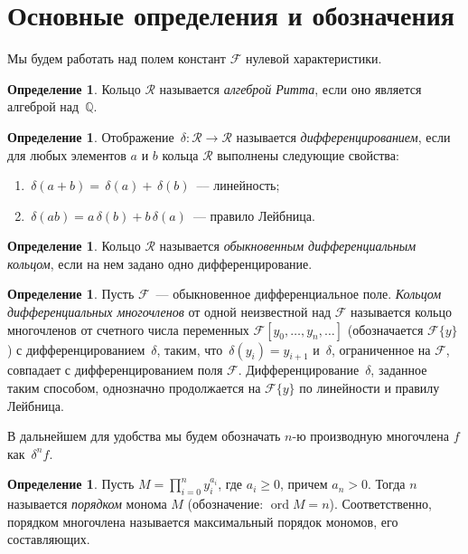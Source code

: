 \documentclass[11pt]{article}
\DeclareMathOperator{\ord}{ord}
\renewcommand{\ge}{\geqslant}
\newcommand{\diffField}{\mathcal{F}}
\theoremstyle{plain}
\theoremstyle{definition}
\newtheorem{definition}[theorem2]{Определение}
\theoremstyle{remark}
\begin{document}
\section{Основные определения и обозначения}
\label{preliminaries}
Мы будем работать над полем констант $\diffField$ нулевой характеристики.

\begin{definition}
Кольцо $\mathcal{R}$ называется \emph{алгеброй Ритта}, если оно является алгеброй над~$\mathbb{Q}$.
\end{definition}

\begin{definition}
Отображение $\,\delta: \mathcal{R} \to \mathcal{R}$ называется \emph{дифференцированием}, если для любых элементов $a$ и $b$ кольца $\mathcal{R}$
выполнены следующие свойства:
\begin{enumerate}
  \item $\,\delta(a+b)= \,\delta(a)+\,\delta(b)$~--– линейность;
  \item $\,\delta(ab)=a\,\delta(b)+b\,\delta(a)$~--- правило Лейбница.
\end{enumerate}
\end{definition}

\begin{definition}
Кольцо $\mathcal{R}$ называется \emph{обыкновенным дифференциальным кольцом}, если на нем задано одно дифференцирование.
\end{definition}

\begin{definition}
Пусть $\diffField$~--- обыкновенное дифференциальное поле.
\emph{Кольцом дифференциальных многочленов} от одной неизвестной над $\diffField$
называется кольцо многочленов от счетного числа переменных $\diffField[y_0,\ldots,y_n,\ldots]$
(обозначается $\diffField\{y\}$)
с дифференцированием $\,\delta$, таким, что $\,\delta(y_i)=y_{i+1}$ и $\,\delta$, ограниченное на $\diffField$, совпадает с дифференцированием поля $\diffField$. Дифференцирование $\,\delta$, заданное таким способом, однозначно продолжается на $\diffField\{y\}$ по линейности и правилу Лейбница.
\end{definition}

В дальнейшем для удобства мы будем обозначать $n$-ю производную многочлена $f$ как $\,\delta^n f$.

\begin{definition}
Пусть $M = \prod\limits_{i=0}^ny_i^{a_i}$, где $a_i \ge 0$, причем $a_n > 0$. Тогда $n$ называется \emph{порядком} монома $M$ (обозначение: $\ord M=n$). Соответственно, порядком многочлена называется максимальный порядок
мономов, его составляющих.
\end{definition}
\end{document}
